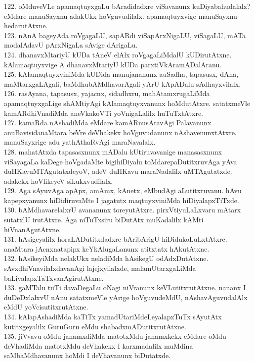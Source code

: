 \documentclass{article}
\begin{document}
122. oMduveVLe apamaqtuyxgaLu bAradidadxre viSavanunx kuDiyabahudalalx? eMdare manuSayxnu adakUkx hoVguvudilalx. apamaqtuyxvige manuSayxnu hedarutAtxne.\\
123. nAnA bageyAda roVgagaLU, sapARdi viSapArxNigaLU, viSagaLU, mATa modalAdavU pArxNigaLa sAvige dArigaLu.\\
124. dhanavxMtariyU kUDa tAneV elAlx roVgagaLiMdalU kUDirutAtxne. kAlamaqtuyxvige A dhanavxMtariyU kUDa parxtiVkAramADalAranu.\\
125. kAlamaqtuyxviniMda kUDida manujananunx auSadha, tapasusx, dAna, maMtarxgaLAgali, baMdhubAMdhavarAgali yArU kApADalu sAdhayxvilalx.\\
126. rasAyana, tapasusx, yajacnx, sidadhxru, mahAtamxrugaLiMda apamaqtuyxgaLige shAMtiyAgi kAlamaqtuyxvanunx hoMdutAtxre. satatxmeVle kamARdhiVnadiMda aneVkakoVTi yoVnigaLalilx huTuTxtAtxre.\\
127. kamaRda nAshadiMda eMdare kamARnusAravAgi Palavanunx anuBavisidanaMtara beVre deVhakekx hoVguvudanunx nAshavenunxtAtxre. manuSayxrige adu yathAthaRvAgi maraNavalalx.\\
128. mahatAtxda tapasasxnunx mADalu kUtiruvavanige manasasxnunx viSayagaLa kaDege hoVgadaMte bigihiDiyalu toMdarepaDutitxruvAga yAva duHKavuMTAgutatxdeyoV, adeV duHKavu maraNadalilx uMTAgutatxde. adakekx hoVlikeyeV sikukxvudilalx.\\
129. Aga sAyuvAga apApx, amAmx, kAnetx, eMbudAgi aLutitxruvanu. hAvu kapepxyanunx hiDidiruvaMte I jagatutx maqtuyxviniMda hiDiyalapxTiTxde.\\
130. bAMdhavarelalxrU avananunx toreyutAtxre. pirxVtiyuLaLxvaru mAtarx sutatxlU irutAtxre. Aga niTuTxsiru biDutAtx muKadalilx kAMti hiVnanAgutAtxne.\\
131. hAsigeyalilx horaLADutitxdadxre bAribArigU hiDidukoLuLxtAtxre. anaMtara jAcnxnatapipx keYkAlugaLanunx atitxtatx hAkutAtxne.\\
132. hAsikeyiMda nelakUkx neladiMda hAsikegU odAdxDutAtxne. sAvxdhiVnavilalxdavanAgi lajejxyilalxde, malamUtarxgaLiMda baLiyalapxTaTxvanAgirutAtxne.\\
133. gaMTalu tuTi davaDegaLu oNagi niVranunx keVLutitxrutAtxne. nananx I duDeDxlalxvU nAnu satatxmeVle yArige hoVguvudeMdU, nAshavAguvudalAlx eMdU yoVcisutitxrutAtxne.\\
134. kAlapAshadiMda kaTiTx yamadUtariMdeLeyalapxTuTx sAyutAtx kutitxgeyalilx GuruGuru eMdu shabadxmADutitxrutAtxne.\\
135. jiVvavu oMdu janamxdiMda matotxMdu janamxkekx eMdare oMdu deVhadiMda matotxMdu deVhakekx I karxmadalilx muMdina saMbaMdhavanunx hoMdi I deVhavanunx biDutatxde.\\
\end{document}
